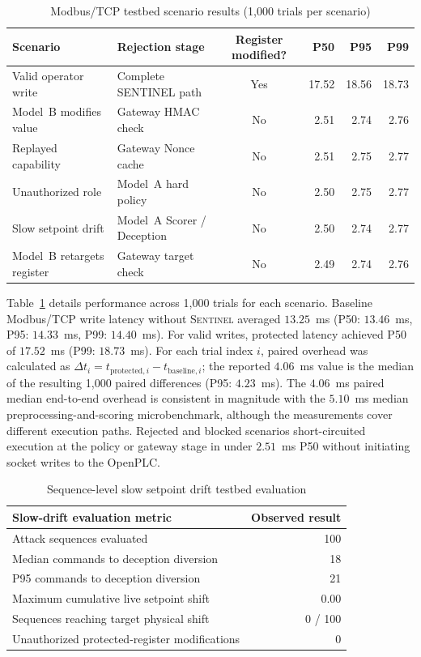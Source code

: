 \documentclass[journal]{IEEEtran}
\renewcommand{\arraystretch}{1.08}
\newcommand{\sentinel}{\textsc{Sentinel}}
\newcommand{\modelb}{Model~B}
\newcommand{\modela}{Model~A}
\begin{document}
\begin{table}[t]
\centering
\caption{Modbus/TCP testbed scenario results (1,000 trials per scenario)}
\label{tab:hil_scenarios}
\renewcommand{\arraystretch}{1.12}
\begin{tabularx}{\columnwidth}{@{}XXcrrr@{}}
\toprule
\textbf{Scenario} & \textbf{Rejection stage} & \textbf{Register modified?} & \textbf{P50} & \textbf{P95} & \textbf{P99} \\
\midrule
Valid operator write & Complete SENTINEL path & Yes & 17.52 & 18.56 & 18.73 \\
\modelb{} modifies value & Gateway HMAC check & No & 2.51 & 2.74 & 2.76 \\
Replayed capability & Gateway Nonce cache & No & 2.51 & 2.75 & 2.77 \\
Unauthorized role & \modela{} hard policy & No & 2.50 & 2.75 & 2.77 \\
Slow setpoint drift & \modela{} Scorer / Deception & No & 2.50 & 2.74 & 2.77 \\
\modelb{} retargets register & Gateway target check & No & 2.49 & 2.74 & 2.76 \\
\bottomrule
\end{tabularx}
\end{table}

Table~\ref{tab:hil_scenarios} details performance across 1,000 trials for each scenario. Baseline Modbus/TCP write latency without \sentinel{} averaged $13.25$~ms (P50: $13.46$~ms, P95: $14.33$~ms, P99: $14.40$~ms). For valid writes, protected latency achieved P50 of $17.52$~ms (P99: $18.73$~ms). For each trial index $i$, paired overhead was calculated as $\Delta t_i = t_{\mathrm{protected},i} - t_{\mathrm{baseline},i}$; the reported $4.06$~ms value is the median of the resulting 1,000 paired differences (P95: $4.23$~ms). The $4.06$~ms paired median end-to-end overhead is consistent in magnitude with the $5.10$~ms median preprocessing-and-scoring microbenchmark, although the measurements cover different execution paths. Rejected and blocked scenarios short-circuited execution at the policy or gateway stage in under $2.51$~ms P50 without initiating socket writes to the OpenPLC.

\begin{table}[t]
\centering
\caption{Sequence-level slow setpoint drift testbed evaluation}
\label{tab:slow_drift_seq}
\renewcommand{\arraystretch}{1.12}
\begin{tabular}{@{}lr@{}}
\toprule
\textbf{Slow-drift evaluation metric} & \textbf{Observed result} \\
\midrule
Attack sequences evaluated & 100 \\
Median commands to deception diversion & 18 \\
P95 commands to deception diversion & 21 \\
Maximum cumulative live setpoint shift & 0.00 \\
Sequences reaching target physical shift & 0 / 100 \\
Unauthorized protected-register modifications & 0 \\
\bottomrule
\end{tabular}
\end{table}
\end{document}
